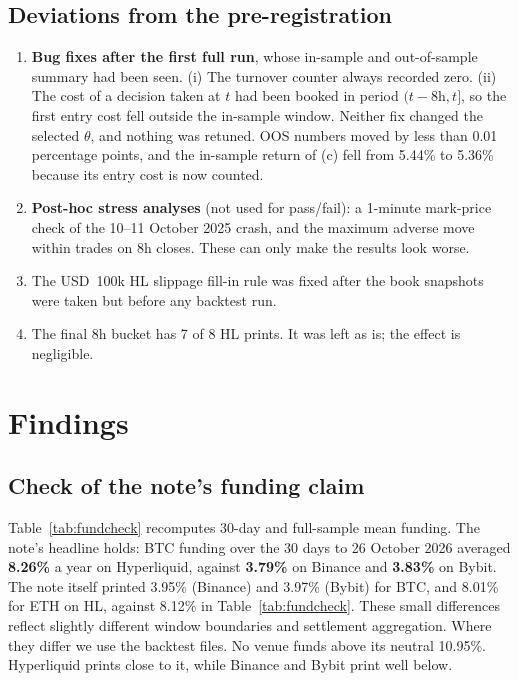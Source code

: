 \documentclass[11pt,a4paper]{article}
\begin{document}
\subsection{Deviations from the pre-registration}
\label{sec:deviations}
\begin{enumerate}
\item \textbf{Bug fixes after the first full run}, whose in-sample and out-of-sample summary had been seen. (i) The turnover counter always recorded zero. (ii) The cost of a decision taken at $t$ had been booked in period $(t-8\text{h}, t]$, so the first entry cost fell outside the in-sample window. Neither fix changed the selected $\theta$, and nothing was retuned. OOS numbers moved by less than 0.01 percentage points, and the in-sample return of (c) fell from 5.44\% to 5.36\% because its entry cost is now counted.
\item \textbf{Post-hoc stress analyses} (not used for pass/fail): a 1-minute mark-price check of the 10--11 October 2025 crash, and the maximum adverse move within trades on 8h closes. These can only make the results look worse.
\item The USD~100k HL slippage fill-in rule was fixed after the book snapshots were taken but before any backtest run.
\item The final 8h bucket has 7 of 8 HL prints. It was left as is; the effect is negligible.
\end{enumerate}

\section{Findings}
\label{sec:findings}

\subsection{Check of the note's funding claim}
Table~\ref{tab:fundcheck} recomputes 30-day and full-sample mean funding.
The note's headline holds: BTC funding over the 30 days to 26 October 2026 averaged \textbf{8.26\%} a year on Hyperliquid, against \textbf{3.79\%} on Binance and \textbf{3.83\%} on Bybit.
The note itself printed 3.95\% (Binance) and 3.97\% (Bybit) for BTC, and 8.01\% for ETH on HL, against 8.12\% in Table~\ref{tab:fundcheck}. These small differences reflect slightly different window boundaries and settlement aggregation. Where they differ we use the backtest files.
No venue funds above its neutral 10.95\%. Hyperliquid prints close to it, while Binance and Bybit print well below.
\end{document}
